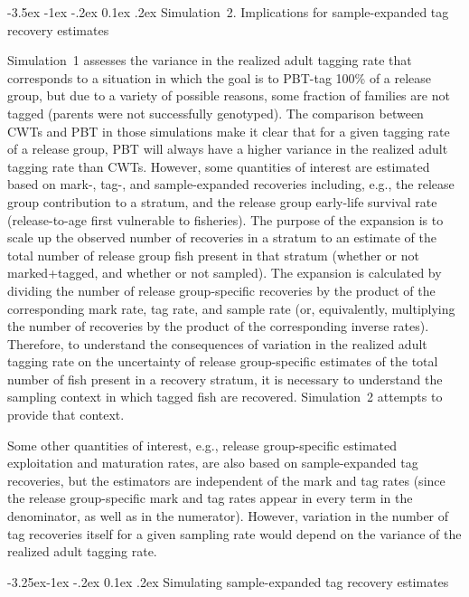 \documentclass[11pt]{article}
\makeatletter
\renewcommand\section{\@startsection {section}{1}{\z@}%
                                   {-3.5ex \@plus -1ex \@minus -.2ex}%
                                   {0.1ex \@plus.2ex}%
                                   {\normalfont\large\bfseries}}
\renewcommand\subsection{\@startsection{subsection}{2}{\z@}%
                                     {-3.25ex\@plus -1ex \@minus -.2ex}%
                                     {0.1ex \@plus .2ex}%
                                     {\normalfont\normalsize\bfseries}}
\makeatother
\begin{document}
\section{Simulation~2. Implications for sample-expanded tag recovery estimates}

Simulation~1 assesses the variance in the realized adult tagging rate that corresponds to a situation in which
the goal is to PBT-tag 100\% of a release group, but due to a variety of possible reasons, some fraction
of families are not tagged (parents were not successfully genotyped).  The comparison between CWTs and PBT in those simulations
make it clear that for a given tagging rate of a release group, PBT will always have a higher
variance in the realized adult tagging rate than CWTs.  
However, some quantities of interest are estimated based on mark-, tag-, and sample-expanded 
recoveries including, e.g., the release group contribution to a stratum, and the release group
early-life survival rate (release-to-age first vulnerable to fisheries). The purpose of the
expansion is to scale up the observed number of recoveries in a stratum to an estimate of the
total number of release group fish present in that stratum (whether or not marked+tagged, and
whether or not sampled). The expansion is calculated by dividing the number of release group-specific
recoveries by the product of the corresponding mark rate, tag rate, and sample rate
(or, equivalently, multiplying the number of recoveries by the product of the corresponding inverse rates).
Therefore, to understand the consequences of variation in the realized adult tagging rate
on the uncertainty of release group-specific estimates of the total number of fish present in a recovery stratum, it is necessary to understand the 
sampling context in which tagged fish are recovered. Simulation~2 attempts to provide that context.  

Some other quantities of interest, e.g., release group-specific estimated exploitation and maturation rates, are also based on sample-expanded tag recoveries, but the estimators are independent of the mark and tag rates (since the release group-specific mark and tag rates appear in every term in the denominator, as well as in the numerator). However, variation in the number of tag recoveries itself for a given sampling rate would depend on the variance of the realized adult tagging rate.

\subsection{Simulating sample-expanded tag recovery estimates}
\end{document}
